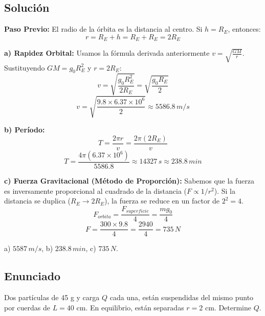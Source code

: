 \documentclass[12pt, a4paper]{article}
\begin{document}
\subsection*{Solución}

\textbf{Paso Previo:}
El radio de la órbita es la distancia al centro. Si $h = R_E$, entonces:
$$ r = R_E + h = R_E + R_E = 2R_E $$

\textbf{a) Rapidez Orbital:}
Usamos la fórmula derivada anteriormente $v = \sqrt{\frac{GM}{r}}$.
Sustituyendo $GM = g_0 R_E^2$ y $r = 2R_E$:
$$ v = \sqrt{\frac{g_0 R_E^2}{2R_E}} = \sqrt{\frac{g_0 R_E}{2}} $$
$$ v = \sqrt{\frac{9.8 \times 6.37 \times 10^6}{2}} \approx 5586.8 \, \si{m/s} $$

\textbf{b) Período:}
$$ T = \frac{2\pi r}{v} = \frac{2\pi (2R_E)}{v} $$
$$ T = \frac{4\pi (6.37 \times 10^6)}{5586.8} \approx 14327 \, \si{s} \approx 238.8 \, \si{min} $$

\textbf{c) Fuerza Gravitacional (Método de Proporción):}
Sabemos que la fuerza es inversamente proporcional al cuadrado de la distancia ($F \propto 1/r^2$).
Si la distancia se duplica ($R_E \to 2R_E$), la fuerza se reduce en un factor de $2^2 = 4$.
$$ F_{orbita} = \frac{F_{superficie}}{4} = \frac{m g_0}{4} $$
$$ F = \frac{300 \times 9.8}{4} = \frac{2940}{4} = 735 \, \si{N} $$

\begin{tcolorbox}[colback=green!5!white,title=Respuesta]
a) $5587 \, \si{m/s}$, b) $238.8 \, \si{min}$, c) $735 \, \si{N}$.
\end{tcolorbox}

\newpage

\subsection*{Enunciado}
Dos partículas de 45 g y carga $Q$ cada una, están suspendidas del mismo punto por cuerdas de $L=40$ cm. En equilibrio, están separadas $r=2$ cm. Determine $Q$.

\begin{center}
\end{center}
\end{document}
